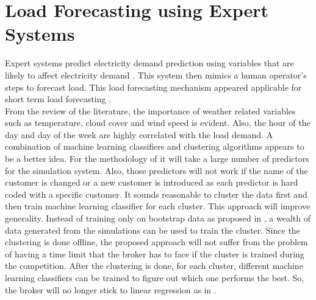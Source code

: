 \section{Load Forecasting using Expert Systems}

Expert systems predict electricity demand prediction using variables that are likely to affect electricity demand \cite{rahman1988expert, ho1990short}. This system then mimics a human operator's steps to forecast load. This load forecasting mechanism appeared applicable for short term load forecasting \cite{rahman1988expert, ho1990short, moghram1989analysis}. \\

From the review of the literature, the importance of weather related variables such as temperature, cloud cover and wind speed is evident. Also, the hour of the day and day of the week are highly correlated with the load demand. A combination of machine learning classifiers and clustering algorithms appears to be a better idea. For the methodology of \cite{parra2013initial} it will take a large number of predictors for the simulation system. Also, those predictors will not work if the name of the customer is changed or a new customer is introduced as each predictor is hard coded with a specific customer. It sounds reasonable to cluster the data first and then train machine learning classifier for each cluster. This approach will improve generality. Instead of training only on bootstrap data as proposed in \cite{wang2015gongbroker}, a wealth of data generated from the simulations can be used to  train the cluster. Since the clustering is done offline, the proposed approach will not  suffer from the problem of having a time limit that the broker has to face if the cluster is trained during the competition. After the clustering is done, for each cluster, different machine learning classifiers can be trained to figure out which one performs the best. So, the broker will no longer stick to linear regression as in \cite{wang2015gongbroker}.

